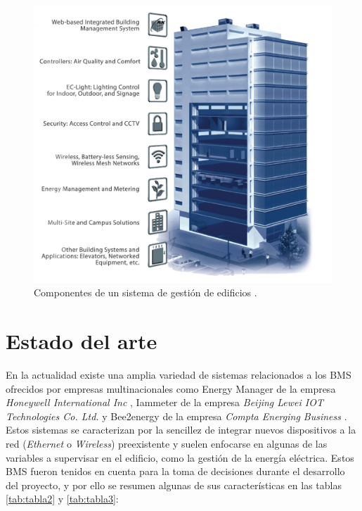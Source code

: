 \vspace{2cm}
\begin{figure}[htbp]
\centering
\includegraphics[width=.85\textwidth]{./Figures/bms4.jpg}
\caption{Componentes de un sistema de gestión de edificios \protect\footnotemark .}
\label{fig:bms}
\end{figure}




\section{Estado del arte}
En la actualidad existe una amplia variedad de sistemas relacionados a los BMS ofrecidos por empresas multinacionales como Energy Manager de la empresa \emph{Honeywell International Inc} \citep{WEBSITE:35}, Iammeter de la empresa \emph{Beijing Lewei IOT Technologies Co. Ltd.} \citep{WEBSITE:36} y Bee2energy de la empresa \emph{Compta Energing Business} \citep{WEBSITE:37}. Estos sistemas se caracterizan por la sencillez de integrar nuevos dispositivos a la red (\emph{Ethernet} o \emph{Wireless}) preexistente y suelen enfocarse en algunas de las variables a supervisar en el edificio, como la gestión de la energía eléctrica. Estos BMS fueron tenidos en cuenta para la toma de decisiones durante el desarrollo del proyecto, y por ello se resumen algunas de sus características en las tablas \ref{tab:tabla2} y \ref{tab:tabla3}:




